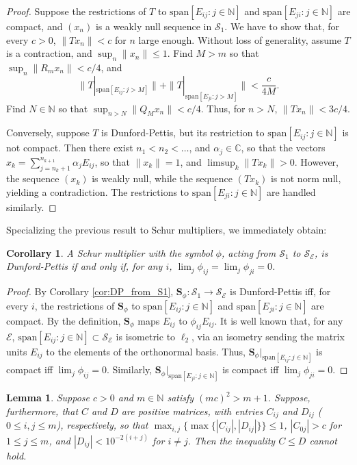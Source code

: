 \documentclass[12pt]{amsart}
\theoremstyle{plain}
\newtheorem{corollary}[theorem]{Corollary}
\newtheorem{lemma}[theorem]{Lemma}
\theoremstyle{definition}
\renewcommand{\leq}{\leqslant}
\newcommand{\N}{\mathbb N}
\newcommand{\C}{\mathbb C}
\newcommand{\schu}{\mathbf S}
\newcommand{\is}{\mathcal S}
\newcommand{\ce}{\mathcal E}
\newcommand{\se}{{\mathcal S}_{\mathcal{E}}}
\renewcommand{\span}{\mathrm{span}}
\begin{document}
\begin{proof}
Suppose the restrictions of $T$ to $\span[E_{ij} : j \in \N]$
and $\span[E_{ji} : j \in \N]$ are compact, and $(x_n)$ is a
weakly null sequence in $\is_1$. We have to show that, for every
$c > 0$, $\|T x_n\| < c$ for $n$ large enough. Without loss of generality,
assume $T$ is a contraction, and $\sup_n \|x_n\| \leq 1$. Find $M > m$
so that $\sup_n \|R_m x_n\| < c/4$, and
$$
\|T|_{\span[E_{ij} : j > M]}\| + \|T|_{\span[E_{ji} : j > M]}\| < \frac{c}{4M} .
$$
Find $N \in \N$ so that $\sup_{n > N} \|Q_M x_n\| < c/4$.
Thus, for $n > N$, $\|T x_n\| < 3c/4$.

Conversely, suppose $T$ is Dunford-Pettis, but its restriction to
$\span[E_{ij} : j \in \N]$ is not compact. Then there exist
$n_1 < n_2 < \ldots$, and $\alpha_j \in \C$, so that the vectors
$x_k = \sum_{j = n_k+1}^{n_{k+1}} \alpha_j E_{ij}$, so that
$\|x_k\| = 1$, and $\limsup_k \|T x_k\| > 0$. However, the sequence
$(x_k)$ is weakly null, while the sequence $(T x_k)$ is not norm null,
yielding a contradiction. The restrictions to $\span[E_{ji} : j \in \N]$
are handled similarly.
\end{proof}

Specializing the previous result to Schur multipliers,
we immediately obtain:

\begin{corollary}\label{cor:DP_Schur}
A Schur multiplier with the symbol $\phi$, acting from $\is_1$
to $\se$, is Dunford-Pettis if and only if, for any $i$,
$\lim_j \phi_{ij} = \lim_j \phi_{ji} = 0$.
\end{corollary}

\begin{proof}
By Corollary \ref{cor:DP_from_S1}, $\schu_\phi : \is_1 \to \se$ is
Dunford-Pettis iff, for every $i$, the restrictions of $\schu_\phi$ to
$\span[E_{ij} : j \in \N]$ and $\span[E_{ji} : j \in \N]$ are compact.
By the definition, $\schu_\phi$ maps $E_{ij}$ to $\phi_{ij} E_{ij}$.
It is well known that, for any $\ce$, $\span[E_{ij} : j \in \N] \subset \se$
is isometric to $\ell_2$, via an isometry sending the matrix units $E_{ij}$ to the
elements of the orthonormal basis. Thus, $\schu_\phi|_{\span[E_{ij} : j \in \N]}$ is
compact iff $\lim_j \phi_{ij} = 0$. Similarly,
$\schu_\phi|_{\span[E_{ji} : j \in \N]}$ is compact iff $\lim_j \phi_{ji} = 0$.
\end{proof}

\begin{lemma}\label{lem:matrices}
Suppose $c > 0$ and $m \in \N$ satisfy $(mc)^2 > m+1$. Suppose,
furthermore, that $C$ and $D$ are positive matrices, with entries
$C_{ij}$ and $D_{ij}$ ($0 \leq i,j \leq m$), respectively,
so that $\max_{i,j} \{\max\{ |C_{ij}|, |D_{ij}|\}\} \leq 1$,
$|C_{0j}| > c$ for $1 \leq j \leq m$, and
$|D_{ij}| < 10^{-2(i+j)}$ for $i \neq j$. Then
the inequality $C \leq D$ cannot hold.
\end{lemma}
\end{document}
